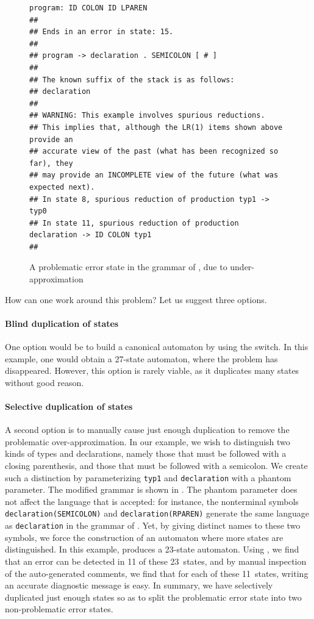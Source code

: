 \documentclass[onecolumn,11pt,nocopyrightspace,preprint]{sigplanconf}
\begin{document}
\begin{figure}
\begin{verbatim}
program: ID COLON ID LPAREN
##
## Ends in an error in state: 15.
##
## program -> declaration . SEMICOLON [ # ]
##
## The known suffix of the stack is as follows:
## declaration
##
## WARNING: This example involves spurious reductions.
## This implies that, although the LR(1) items shown above provide an
## accurate view of the past (what has been recognized so far), they
## may provide an INCOMPLETE view of the future (what was expected next).
## In state 8, spurious reduction of production typ1 -> typ0
## In state 11, spurious reduction of production declaration -> ID COLON typ1
##
\end{verbatim}
\caption{A problematic error state in the grammar of , due to under-approximation}
\label{fig:declarations:under}
\end{figure}

How can one work around this problem? Let us suggest three options.

\paragraph{Blind duplication of states}

One option would be to build a canonical automaton by using the
\ocanonical switch. In this example, one would
obtain a 27-state automaton, where the problem has disappeared. However, this
option is rarely viable, as it duplicates many states without good reason.

\paragraph{Selective duplication of states}

A second option is to manually cause just enough duplication to remove the
problematic over-approximation. In our example, we wish to distinguish two kinds
of types and declarations, namely those that must be followed with a closing
parenthesis, and those that must be followed with a semicolon. We create
such a distinction by parameterizing \verb+typ1+ and \verb+declaration+ with a
phantom parameter. The modified grammar is shown
in . The phantom parameter does not affect the
language that is accepted: for instance, the nonterminal
symbols \texttt{declaration(SEMICOLON)} and
\texttt{declaration(RPAREN)} generate the same language as \texttt{declaration}
in the grammar of . Yet, by giving
distinct names to these two symbols, we force the construction of an
automaton where more states are distinguished. In this example, \menhir produces
a 23-state automaton. Using \olisterrors, we find that an error can be
detected in 11 of these 23~states, and by manual inspection of the
auto-generated comments, we find that for each of these 11~states, writing an
accurate diagnostic message is easy. In summary, we have selectively duplicated
just enough states so as to split the problematic error state into two
non-problematic error states.
\end{document}
